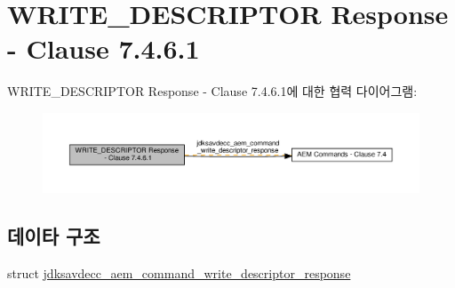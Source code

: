 \hypertarget{group__command__write__descriptor__response}{}\section{W\+R\+I\+T\+E\+\_\+\+D\+E\+S\+C\+R\+I\+P\+T\+OR Response -\/ Clause 7.4.6.1}
\label{group__command__write__descriptor__response}
W\+R\+I\+T\+E\+\_\+\+D\+E\+S\+C\+R\+I\+P\+T\+OR Response -\/ Clause 7.4.6.1에 대한 협력 다이어그램\+:
\nopagebreak
\begin{figure}[H]
\begin{center}
\leavevmode
\includegraphics[width=350pt]{group__command__write__descriptor__response}
\end{center}
\end{figure}
\subsection*{데이타 구조}
\begin{DoxyCompactItemize}
\item 
struct \hyperlink{structjdksavdecc__aem__command__write__descriptor__response}{jdksavdecc\+\_\+aem\+\_\+command\+\_\+write\+\_\+descriptor\+\_\+response}
\end{DoxyCompactItemize}
